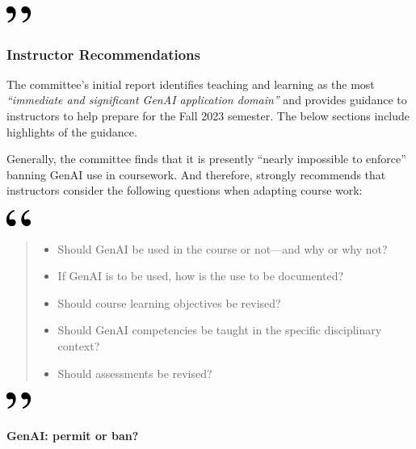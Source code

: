 \documentclass[
]{book}
\begin{document}
\includegraphics[width=0.3125in,height=0.20833in]{close.png}

\hypertarget{instructor-recommendations}{%
\subsubsection*{Instructor Recommendations}\label{instructor-recommendations}}

The committee's initial report identifies teaching and learning as the most \emph{``immediate and significant GenAI application domain''} and provides guidance to instructors to help prepare for the Fall 2023 semester. The below sections include highlights of the guidance.

Generally, the committee finds that it is presently ``nearly impossible to enforce'' banning GenAI use in coursework. And therefore, strongly recommends that instructors consider the following questions when adapting course work:

\includegraphics[width=0.3125in,height=0.20833in]{open.png}

\begin{quote}
\begin{itemize}
\item
  Should GenAI be used in the course or not---and why or why not?
\item
  If GenAI is to be used, how is the use to be documented?
\item
  Should course learning objectives be revised?
\item
  Should GenAI competencies be taught in the specific disciplinary context?
\item
  Should assessments be revised?
\end{itemize}
\end{quote}

\includegraphics[width=0.3125in,height=0.20833in]{close.png}

\hypertarget{genai-permit-or-ban}{%
\paragraph*{GenAI: permit or ban?}\label{genai-permit-or-ban}}
\end{document}
